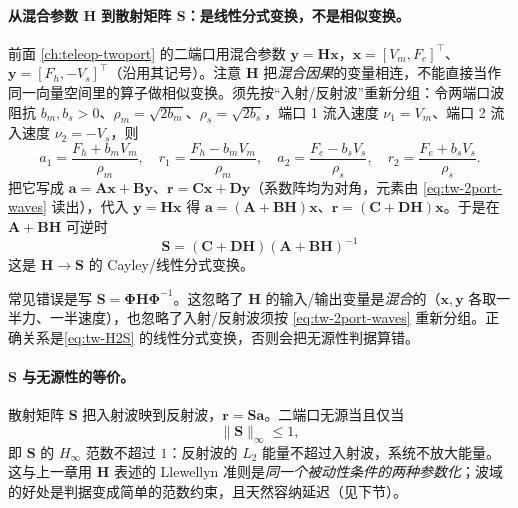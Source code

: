 \paragraph{从混合参数 $\mathbf H$ 到散射矩阵 $\mathbf S$：是线性分式变换，不是相似变换。}
前面 \cref{ch:teleop-twoport} 的二端口用混合参数 $\mathbf y=\mathbf H\mathbf x$，$\mathbf x=[V_m,F_e]^\top$、$\mathbf y=[F_h,-V_s]^\top$（沿用其记号）。注意 $\mathbf H$ 把\emph{混合因果}的变量相连，不能直接当作同一向量空间里的算子做相似变换。须先按“入射/反射波”重新分组：令两端口波阻抗 $b_m,b_s>0$、$\rho_m=\sqrt{2b_m}$、$\rho_s=\sqrt{2b_s}$，端口 1 流入速度 $\nu_1=V_m$、端口 2 流入速度 $\nu_2=-V_s$，则
\begin{equation}
  a_1=\frac{F_h+b_mV_m}{\rho_m},\quad r_1=\frac{F_h-b_mV_m}{\rho_m},\quad
  a_2=\frac{F_e-b_sV_s}{\rho_s},\quad r_2=\frac{F_e+b_sV_s}{\rho_s}.
  \label{eq:tw-2port-waves}
\end{equation}
把它写成 $\mathbf a=\mathbf A\mathbf x+\mathbf B\mathbf y$、$\mathbf r=\mathbf C\mathbf x+\mathbf D\mathbf y$（系数阵均为对角，元素由 \cref{eq:tw-2port-waves} 读出），代入 $\mathbf y=\mathbf H\mathbf x$ 得 $\mathbf a=(\mathbf A+\mathbf B\mathbf H)\mathbf x$、$\mathbf r=(\mathbf C+\mathbf D\mathbf H)\mathbf x$。于是在 $\mathbf A+\mathbf B\mathbf H$ 可逆时
\begin{equation}
  \boxed{\ \mathbf S=(\mathbf C+\mathbf D\mathbf H)(\mathbf A+\mathbf B\mathbf H)^{-1}\ }
  \label{eq:tw-H2S}
\end{equation}
这是 $\mathbf H\to\mathbf S$ 的 Cayley/线性分式变换。

\begin{pitfall}
常见错误是写 $\mathbf S=\boldsymbol\Phi\mathbf H\boldsymbol\Phi^{-1}$。这忽略了 $\mathbf H$ 的输入/输出变量是\emph{混合}的（$\mathbf x,\mathbf y$ 各取一半力、一半速度），也忽略了入射/反射波须按 \cref{eq:tw-2port-waves} 重新分组。正确关系是\cref{eq:tw-H2S} 的线性分式变换，否则会把无源性判据算错。
\end{pitfall}

\paragraph{$\mathbf S$ 与无源性的等价。}
散射矩阵 $\mathbf S$ 把入射波映到反射波，$\mathbf r=\mathbf S\mathbf a$。二端口无源当且仅当
\begin{equation}
  \|\mathbf S\|_\infty\le1,
  \label{eq:tw-Sinf}
\end{equation}
即 $\mathbf S$ 的 $H_\infty$ 范数不超过 $1$：反射波的 $L_2$ 能量不超过入射波，系统不放大能量。这与上一章用 $\mathbf H$ 表述的 Llewellyn 准则是\emph{同一个被动性条件的两种参数化}；波域的好处是判据变成简单的范数约束，且天然容纳延迟（见下节）。

